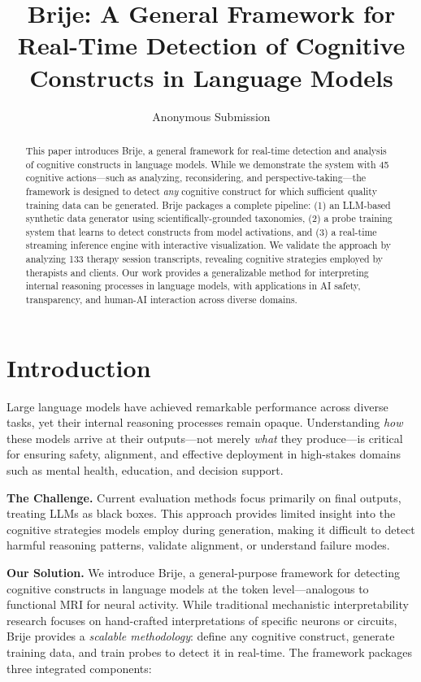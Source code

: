 \documentclass[letterpaper]{article}
\title{Brije: A General Framework for Real-Time Detection of Cognitive Constructs in Language Models}
\author{
    Anonymous Submission
}
\begin{document}
\maketitle

\begin{abstract}
This paper introduces Brije, a general framework for real-time detection and analysis of cognitive constructs in language models. While we demonstrate the system with 45 cognitive actions—such as analyzing, reconsidering, and perspective-taking—the framework is designed to detect \emph{any} cognitive construct for which sufficient quality training data can be generated. Brije packages a complete pipeline: (1) an LLM-based synthetic data generator using scientifically-grounded taxonomies, (2) a probe training system that learns to detect constructs from model activations, and (3) a real-time streaming inference engine with interactive visualization. We validate the approach by analyzing 133 therapy session transcripts, revealing cognitive strategies employed by therapists and clients. Our work provides a generalizable method for interpreting internal reasoning processes in language models, with applications in AI safety, transparency, and human-AI interaction across diverse domains.
\end{abstract}

\section{Introduction}

Large language models have achieved remarkable performance across diverse tasks, yet their internal reasoning processes remain opaque. Understanding \emph{how} these models arrive at their outputs—not merely \emph{what} they produce—is critical for ensuring safety, alignment, and effective deployment in high-stakes domains such as mental health, education, and decision support.

\textbf{The Challenge.} Current evaluation methods focus primarily on final outputs, treating LLMs as black boxes. This approach provides limited insight into the cognitive strategies models employ during generation, making it difficult to detect harmful reasoning patterns, validate alignment, or understand failure modes.

\textbf{Our Solution.} We introduce Brije, a general-purpose framework for detecting cognitive constructs in language models at the token level—analogous to functional MRI for neural activity. While traditional mechanistic interpretability research focuses on hand-crafted interpretations of specific neurons or circuits, Brije provides a \emph{scalable methodology}: define any cognitive construct, generate training data, and train probes to detect it in real-time. The framework packages three integrated components:
\end{document}
